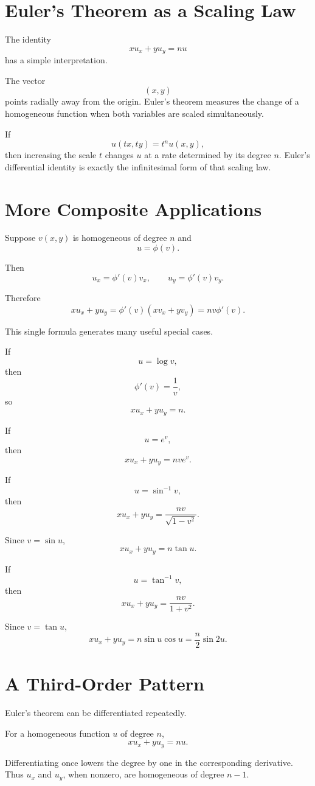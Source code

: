 \documentclass[11pt,oneside]{book}
\theoremstyle{studentthm}
\theoremstyle{definition}
\begin{document}
\section{Euler's Theorem as a Scaling Law}

The identity
\[
xu_x+yu_y=nu
\]
has a simple interpretation.

The vector
\[
(x,y)
\]
points radially away from the origin. Euler's theorem measures the
change of a homogeneous function when both variables are scaled
simultaneously.

If
\[
u(tx,ty)=t^nu(x,y),
\]
then increasing the scale \(t\) changes \(u\) at a rate determined by
its degree \(n\). Euler's differential identity is exactly the
infinitesimal form of that scaling law.

\section{More Composite Applications}

Suppose \(v(x,y)\) is homogeneous of degree \(n\) and
\[
u=\phi(v).
\]

Then
\[
u_x=\phi'(v)v_x,
\qquad
u_y=\phi'(v)v_y.
\]

Therefore
\[
xu_x+yu_y
=
\phi'(v)(xv_x+yv_y)
=
nv\phi'(v).
\]

This single formula generates many useful special cases.

If
\[
u=\log v,
\]
then
\[
\phi'(v)=\frac1v,
\]
so
\[
xu_x+yu_y=n.
\]

If
\[
u=e^v,
\]
then
\[
xu_x+yu_y=nve^v.
\]

If
\[
u=\sin^{-1}v,
\]
then
\[
xu_x+yu_y
=
\frac{nv}{\sqrt{1-v^2}}.
\]

Since \(v=\sin u\),
\[
xu_x+yu_y
=
n\tan u.
\]

If
\[
u=\tan^{-1}v,
\]
then
\[
xu_x+yu_y
=
\frac{nv}{1+v^2}.
\]

Since \(v=\tan u\),
\[
xu_x+yu_y
=
n\sin u\cos u
=
\frac n2\sin2u.
\]

\section{A Third-Order Pattern}

Euler's theorem can be differentiated repeatedly.

For a homogeneous function \(u\) of degree \(n\),
\[
xu_x+yu_y=nu.
\]

Differentiating once lowers the degree by one in the corresponding
derivative. Thus \(u_x\) and \(u_y\), when nonzero, are homogeneous of
degree \(n-1\).
\end{document}
